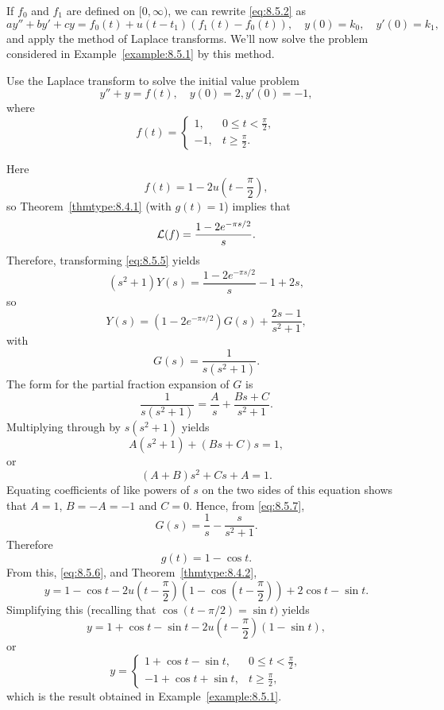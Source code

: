 \documentclass{ximera}
\begin{document}
If $f_0$ and $f_1$ are defined on $[0,\infty)$, we can rewrite
\eqref{eq:8.5.2} as
$$
ay''+by'+cy=f_0(t)+u(t-t_1)\left(f_1(t)-f_0(t)\right), \quad  y(0)=k_0,\quad y'(0)=k_1,
$$
and apply the method of Laplace transforms. We'll now solve
the problem considered in Example~\ref{example:8.5.1} by this method.

\begin{example}\label{example:8.5.2}
\space Use the Laplace transform to solve the initial value problem
\begin{equation}\label{eq:8.5.5}
y''+y=f(t), \quad   y(0)=2,  y'(0)=-1,
\end{equation}
where
$$
f(t)=\left\{\begin{array}{cl}
1,&0\leq t<\frac{\pi}{2},\\
-1,&t\geq\frac{\pi}{2}.
\end{array}\right.
$$

\begin{explanation} Here
$$
f(t)=1-2u\left(t-\frac{\pi}{2}\right),
$$
so Theorem~\ref{thmtype:8.4.1} (with $g(t)=1$) implies that
$$
{\cal L}(f)=\frac{1-2e^{-{\pi s/2}}}{s}.
$$
Therefore, transforming  \eqref{eq:8.5.5} yields
$$
(s^2+1)Y(s)=\frac{1-2e^{-{\pi s/ 2}}}{s}-1+2s,
$$
 so
\begin{equation}\label{eq:8.5.6}
Y(s)=(1-2e^{-{\pi s/ 2}}) G(s)+\frac{2s-1}{s^2+1},
\end{equation}
with
$$
G(s)=\frac{1}{s(s^2+1)}.
$$
The form for the partial fraction expansion of $G$ is
\begin{equation}\label{eq:8.5.7}
\frac{1}{s(s^2+1)}=\frac{A}{s}+\frac{Bs+C}{s^2+1}.
\end{equation}
Multiplying through by $s(s^2+1)$ yields
$$
A(s^2+1)+(Bs+C)s=1,
$$
or
$$
(A+B)s^2+Cs+A=1.
$$
Equating coefficients of like powers of $s$ on the two sides of this
equation shows that $A=1$, $B=-A=-1$ and $C=0$. Hence, from
\eqref{eq:8.5.7},
$$
G(s)=\frac{1}{s}-\frac{s}{s^2+1}.
$$
Therefore
$$
g(t)=1-\cos t.
$$
From this, \eqref{eq:8.5.6}, and
Theorem~\ref{thmtype:8.4.2},
$$
y=1-\cos t-2u\left(t-\frac{\pi}{2}\right)\left(1-\cos\left(t-\frac{\pi}{2}\right)\right)+2\cos t-\sin t.
$$
Simplifying this (recalling that $\cos (t-\pi/2)=\sin t)$ yields
$$
y=1+\cos t-\sin t-2u\left(t-\frac{\pi}{2}\right)(1-\sin t),
$$
or
$$
y=\left\{\begin{array}{cl}
1+\cos t-\sin t,&0\leq t<\frac{\pi}{2},\\
-1+\cos t+\sin t,&t\geq \frac{\pi}{2},
\end{array}\right.
$$
which is the result obtained in Example~\ref{example:8.5.1}.
\end{explanation}
\end{example}
\end{document}
